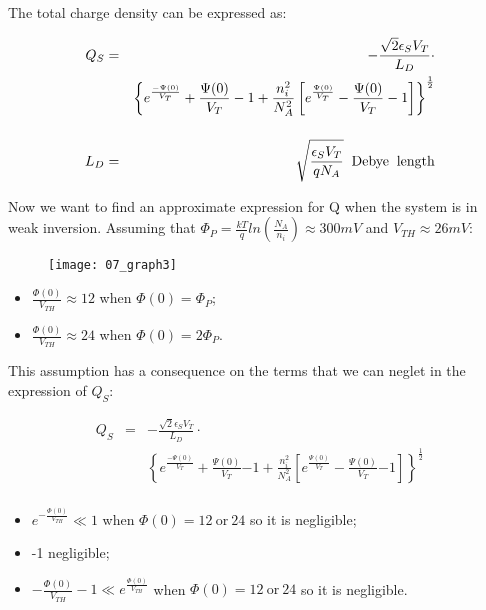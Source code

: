 \documentclass[a4paper, 12pt, twoside, openright]{report}
\begin{document}
The total charge density can be expressed as:

    \begin{eqnarray*}
      Q_S&=&-\frac{\sqrt{2} \epsilon_S V_T}{L_D}\cdot \\
         & &\displaystyle\left\{e^{\frac{-\Psi(0)}{V_T}}+ {\frac{\Psi(0)}{V_T}}-1+
             \frac{n_i^2}{N_A^2}\left[\displaystyle {e^{ \frac{\Psi(0)}{V_T}}} -
             \frac{\Psi(0)}{V_T}-1\right]\right\}^{\frac{1}{2}}\\[3ex]
       L_D&=& \sqrt{\frac{\epsilon_S V_T}{qN_A}}\;\; \rm{Debye\;\;length}
    \end{eqnarray*}

Now we want to find an approximate expression for Q when the system is in weak inversion. Assuming that $\Phi_P = \frac{kT}{q}ln\left(\frac{N_A}{n_i}\right) \approx 300 mV$ and $V_{TH} \approx 26 mV$:

	\begin{figure}[H]
	\centering
	\texttt{[image: 07\_graph3]}
	\caption{}
	\label{tau}
	\end{figure}

\begin{itemize}
\item $\frac{\Phi(0)}{V_{TH}} \approx 12$ when $\Phi(0) = \Phi_P$;
\item$\frac{\Phi(0)}{V_{TH}} \approx 24$ when $\Phi(0) = 2 \Phi_P$.
\end{itemize}

This assumption has a consequence on the terms that we can neglet in the expression of $Q_{S}$:


	\begin{eqnarray*}
      Q_S&=&-\frac{\sqrt{2} \epsilon_S V_T}{L_D}\cdot \\
         & &\displaystyle\left\{{e^{\frac{-\Psi(0)}{V_T}}}+ {\frac{\Psi(0)}{V_T}}{-1}+
             \frac{n_i^2}{N_A^2}\left[\displaystyle {e^{ \frac{\Psi(0)}{V_T}}} -
             {\frac{\Psi(0)}{V_T}}{-1}\right]\right\}^{\frac{1}{2}}\\[3ex]      
    \end{eqnarray*}


\begin{itemize}
\item $e^{-\frac{\Phi(0)}{V_{TH}}} \ll 1$ when $\Phi(0) = 12\ \text{or}\ 24$ so it is negligible;
\item -1 negligible;
\item$-\frac{\Phi(0)}{V_{TH}} -1 \ll e^{\frac{\Phi(0)}{V_{TH}}}$ when $\Phi(0) = 12\ \text{or}\ 24$ so it is negligible.
\end{itemize}
\end{document}
